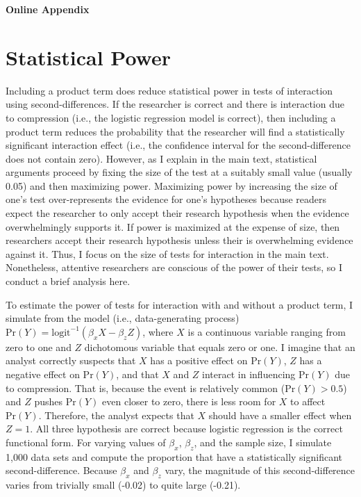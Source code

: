 \documentclass[12pt]{article}
\begin{document}
\singlespace

%

\newpage
\begin{appendix}
\singlespace

\begin{center}
\LARGE{\textbf{Online Appendix}}\vspace{4mm}
\end{center}
\section*{Statistical Power}

Including a product term does reduce statistical power in tests of interaction using second-differences. If the researcher is correct and there is interaction due to compression (i.e., the logistic regression model is correct), then including a product term reduces the probability that the researcher will find a statistically significant interaction effect (i.e., the confidence interval for the second-difference does not contain zero). However, as I explain in the main text, statistical arguments proceed by fixing the size of the test at a suitably small value (usually 0.05) and then maximizing power. Maximizing power by increasing the size of one's test over-represents the evidence for one's hypotheses because readers expect the researcher to only accept their research hypothesis when the evidence overwhelmingly supports it. If power is maximized at the expense of size, then researchers accept their research hypothesis unless their is overwhelming evidence against it. Thus, I focus on the size of tests for interaction in the main text. Nonetheless, attentive researchers are conscious of the power of their tests, so I conduct a brief analysis here.

To estimate the power of tests for interaction with and without a product term, I simulate from the model (i.e., data-generating process) $\text{Pr}(Y) = \text{logit}^{-1}(\beta_xX - \beta_zZ)$, where $X$ is a continuous variable ranging from zero to one and $Z$ dichotomous variable that equals zero or one. I imagine that an analyst correctly suspects that $X$ has a positive effect on $\text{Pr}(Y)$, $Z$ has a negative effect on $\text{Pr}(Y)$, and that $X$ and $Z$ interact in influencing $\text{Pr}(Y)$ due to compression. That is, because the event is relatively common ($\text{Pr}(Y) > 0.5$) and $Z$ pushes $\text{Pr}(Y)$ even closer to zero, there is less room for $X$ to affect $\text{Pr}(Y)$. Therefore, the analyst expects that $X$ should have a smaller effect when $Z=1$. All three hypothesis are correct because logistic regression is the correct functional form. For varying values of $\beta_x$, $\beta_z$, and the sample size, I simulate 1,000 data sets and compute the proportion that have a statistically significant second-difference. Because $\beta_x$ and $\beta_z$ vary, the magnitude of this second-difference varies from trivially small (-0.02) to quite large (-0.21).


\end{appendix}
\end{document}
